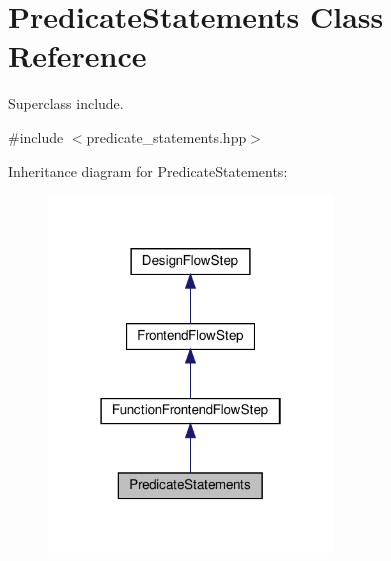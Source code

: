 \hypertarget{classPredicateStatements}{}\section{Predicate\+Statements Class Reference}
\label{classPredicateStatements}


Superclass include.  




{\ttfamily \#include $<$predicate\+\_\+statements.\+hpp$>$}



Inheritance diagram for Predicate\+Statements\+:
\nopagebreak
\begin{figure}[H]
\begin{center}
\leavevmode
\includegraphics[width=214pt]{d8/dcf/classPredicateStatements__inherit__graph}
\end{center}
\end{figure}


